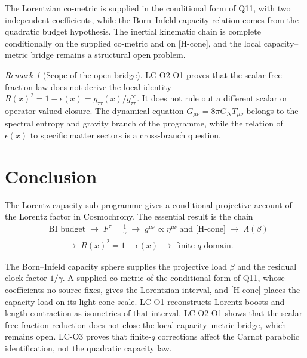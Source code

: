 \documentclass[12pt,a4paper]{article}
\theoremstyle{remark}
\newtheorem*{remark}{Remark}
\begin{document}
  The Lorentzian co-metric is supplied in the conditional form of Q11, with two independent coefficients, while
  the Born--Infeld capacity relation comes from the quadratic budget hypothesis.
  The inertial kinematic chain is complete conditionally on the supplied co-metric and on [H-cone], and the local
  capacity--metric bridge remains a structural open problem.

  \begin{remark}[Scope of the open bridge]
LC-O2-O1 proves that the scalar free-fraction law does not derive the local identity
$R(x)^2 = 1-\epsilon(x) = g_{\tau\tau}(x)/g_{\tau\tau}^\infty$.
It does not rule out a different scalar or operator-valued closure.
The dynamical equation $G_{\mu\nu} = 8\pi G_N T_{\mu\nu}$ belongs to the spectral entropy
and gravity branch of the programme, while the relation of $\epsilon(x)$ to specific matter
sectors is a cross-branch question.
  \end{remark}

  \section{Conclusion}
  \label{sec:conclusion}

  The Lorentz-capacity sub-programme gives a conditional projective account of the Lorentz
  factor in Cosmochrony.
  The essential result is the chain
  \begin{align*}
    &\text{BI budget}
    \;\to\;
    F^\tau = \tfrac{1}{\gamma}
    \;\to\;
    g^{\mu\nu}\propto\eta^{\mu\nu}\ \text{and [H-cone]}
    \;\to\;
    \Lambda(\beta)\\
    &\qquad\to\;
    R(x)^2 = 1-\epsilon(x)
    \;\to\;
    \text{finite-}q\text{ domain.}
  \end{align*}

  The Born--Infeld capacity sphere supplies the projective load $\beta$ and the residual clock
  factor $1/\gamma$.
  A supplied co-metric of the conditional form of Q11, whose coefficients no source fixes, gives the Lorentzian
  interval, and [H-cone] places the capacity load on its light-cone scale.
  LC-O1 reconstructs Lorentz boosts and length contraction as isometries of that interval.
  LC-O2-O1 shows that the scalar free-fraction reduction does not close the local
  capacity--metric bridge, which remains open.
  LC-O3 proves that finite-$q$ corrections affect the Carnot parabolic identification, not the
  quadratic capacity law.
\end{document}
